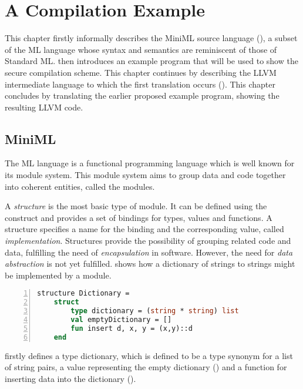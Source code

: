 \chapter{A Compilation Example}
\label{chap:ACompilationExample}
This chapter firstly informally describes the \mbox{MiniML} source language (), a subset of the ML language whose syntax and semantics are reminiscent of those of Standard ML.
 then introduces an example program that will be used to show the secure compilation scheme.
This chapter continues by describing the LLVM intermediate language to which the first translation occurs ().
This chapter concludes by translating the earlier proposed example program, showing the resulting LLVM code.

\section{MiniML}
\label{sec:MiniML}
The ML language is a functional programming language which is well known for its module system.
This module system aims to group data and code together into coherent entities, called the modules.

A \emph{structure} is the most basic type of module.
It can be defined using the  construct and provides a set of bindings for types, values and functions.
A structure specifies a name for the binding and the corresponding value, called \emph{implementation}.
Structures provide the possibility of grouping related code and data, fulfilling the need of \emph{encapsulation} in software.
However, the need for \emph{data abstraction} is not yet fulfilled.
 shows how a dictionary of strings to strings might be implemented by a module.
~
\begin{lstlisting}[frame=single, language=ML,caption=An example structure showing the definition of a dictionary in ML, label=code:DictionaryStructureExample,numbers=left]
structure Dictionary =
    struct
        type dictionary = (string * string) list
        val emptyDictionary = []
        fun insert d, x, y = (x,y)::d
    end
\end{lstlisting}

 firstly defines a type dictionary, which is defined to be a type synonym for a list of string pairs, a value representing the empty dictionary () and a function for inserting data into the dictionary ().

